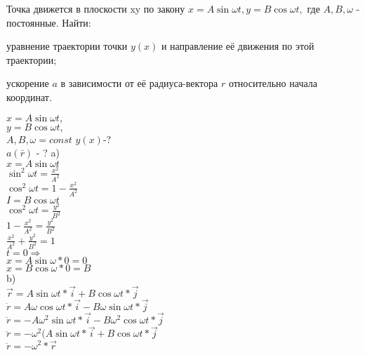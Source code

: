 {Точка движется в плоскости xy по закону \(x = A\sin \omega t  ,  y = B \cos \omega t , \) где \( A,B,\omega\)  - постоянные.
Найти: \newline 
 \begin{inparaenum} 
	 \indent \item уравнение траектории точки \(y(x)\) и направление её движения по этой траектории;\newline
	 \indent \item ускорение \( a \) в зависимости от её радиуса-вектора \( r \) относительно начала координат.
\end{inparaenum}}
{%
\(x = A\sin \omega t ,\)\\
 \(y = B \cos \omega t , \)\\
 \( A,B,\omega = const\)
}
{%
\(y(x)\)-?\\
\( a(\bar{r}) \) - ?
}
{%
a)\\
\( x = A \sin \omega t \)\\
\( \sin^2 \omega t = \frac{x^2}{A^2}\)\\
\( \cos^2\omega t = 1 - \frac{x^2}{A^2}\)\\
\(I = B \cos \omega t\)\\
\( \cos^2 \omega t = \frac{y^2}{B^2}\)\\
\(1 -  \frac{x^2}{A^2} = \frac{y^2}{B^2}\)\\
\(\frac{x^2}{A^2} +\frac{y^2}{B^2} =1 \)\\

$t=0 \Rightarrow$\\
$x=A\sin \omega * 0 = 0$\\
$x=B\cos \omega * 0 = B$\\

b)\\
\(\vec{r}=A\sin \omega t * \vec{i} + B \cos \omega t * \vec{j} \)\\
\(\dot r=A \omega \cos \omega t * \vec{i} - B \omega \sin \omega t * \vec{j} \)\\
\(\ddot r= - A \omega^2 \sin \omega t * \vec{i} - B \omega^2 \cos \omega t * \vec{j} \)\\
\(\ddot r= -\omega^2(A \sin \omega t * \vec{i} + B \cos \omega t * \vec{j} \)\\
\(\ddot r = -\omega^2 * \vec{r} \)\\
}

